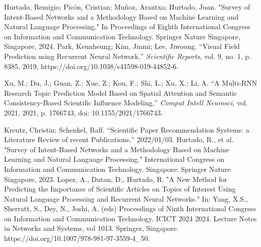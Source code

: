 \documentclass[runningheads]{llncs}
\begin{document}
\begin{thebibliography}{00}
    Hurtado, Remigio; Picón, Cristian; Muñoz, Arantxa; Hurtado, Juan.
    "Survey of Intent-Based Networks and a Methodology Based on Machine Learning and Natural Language Processing."
    In Proceedings of Eighth International Congress on Information and Communication Technology.
    Springer Nature Singapore, Singapore, 2024.
    Park, Keunheung; Kim, Jinmi; Lee, Jiwoong. 
    ``Visual Field Prediction using Recurrent Neural Network,'' 
    \emph{Scientific Reports}, 
    vol. 9, no. 1, p. 8385, 
    2019, 
    https://doi.org/10.1038/s41598-019-44852-6.
    
    Xu, M.; Du, J.; Guan, Z.; Xue, Z.; Kou, F.; Shi, L.; Xu, X.; Li, A. 
    ``A Multi-RNN Research Topic Prediction Model Based on Spatial Attention and Semantic Consistency-Based Scientific Influence Modeling,'' 
    \emph{Comput Intell Neurosci}, 
    vol. 2021, 
    2021, 
    p. 1766743, 
    doi: 10.1155/2021/1766743.
    
    Kreutz, Christin; Schenkel, Ralf.
    ``Scientific Paper Recommendation Systems: a Literature Review of recent Publications,''
    2022/01/03.
	 Hurtado, R., et al. "Survey of Intent-Based Networks and a Methodology Based on Machine Learning and Natural Language Processing." International Congress on Information and Communication Technology. Singapore: Springer Nature Singapore, 2023.
     Lopez, A., Dutan, D., Hurtado, R. "A New Method for Predicting the Importance of Scientific Articles on Topics of Interest Using Natural Language Processing and Recurrent Neural Networks." In: Yang, X.S., Sherratt, S., Dey, N., Joshi, A. (eds) Proceedings of Ninth International Congress on Information and Communication Technology. ICICT 2024 2024. Lecture Notes in Networks and Systems, vol 1013. Springer, Singapore. https://doi.org/10.1007/978-981-97-3559-4\_50.
\end{thebibliography}
\end{document}
